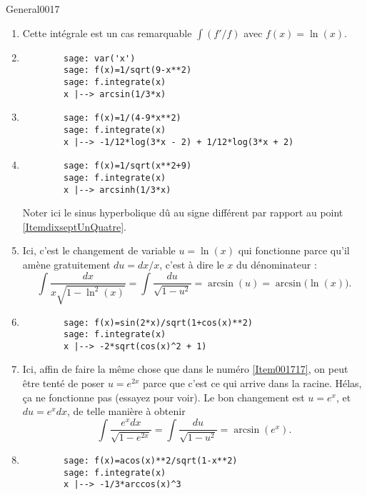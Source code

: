 \begin{corrige}{General0017}
\begin{enumerate}
\item
Cette intégrale est un cas remarquable $\int (f'/f)$ avec $f(x)=\ln(x)$.

\item\label{ItemdixseptUnQuatre}
	
	\begin{verbatim}
		sage: var('x')
		sage: f(x)=1/sqrt(9-x**2)
		sage: f.integrate(x)
		x |--> arcsin(1/3*x)
	\end{verbatim}


\item
	\begin{verbatim}
		sage: f(x)=1/(4-9*x**2)
		sage: f.integrate(x)   
		x |--> -1/12*log(3*x - 2) + 1/12*log(3*x + 2)
	\end{verbatim}
\item

	\begin{verbatim}
		sage: f(x)=1/sqrt(x**2+9)
		sage: f.integrate(x)     
		x |--> arcsinh(1/3*x)
	\end{verbatim}
	Noter ici le sinus hyperbolique dû au signe différent par rapport au point \ref{ItemdixseptUnQuatre}.
\item\label{Item001717}
Ici, c'est le changement de variable $u=\ln(x)$ qui fonctionne parce qu'il amène gratuitement $du=dx/x$, c'est à dire le $x$ du dénominateur :
\begin{equation}
	\int\frac{ dx }{ x\sqrt{1-\ln^2(x)} }=\int\frac{ du }{ \sqrt{1-u^2} }=\arcsin(u)=\arcsin\big( \ln(x) \big).
\end{equation}

\item

	\begin{verbatim}
		sage: f(x)=sin(2*x)/sqrt(1+cos(x)**2)
		sage: f.integrate(x)                 
		x |--> -2*sqrt(cos(x)^2 + 1)
	\end{verbatim}
	

\item
Ici, affin de faire la même chose que dans le numéro \ref{Item001717}, on peut être tenté de poser $u= e^{2x}$ parce que c'est ce qui arrive dans la racine. Hélas, ça ne fonctionne pas (essayez pour voir). Le bon changement est $u=e^x$, et $du= e^{x}dx$, de telle manière à obtenir
\begin{equation}
	\int\frac{  e^{x}dx }{ \sqrt{1- e^{2x}} }=\int\frac{ du }{ \sqrt{1-u^2} }=\arcsin(e^x).
\end{equation}

\item
	\begin{verbatim}
		sage: f(x)=acos(x)**2/sqrt(1-x**2)
		sage: f.integrate(x)              
		x |--> -1/3*arccos(x)^3
	\end{verbatim}


\end{enumerate}
\end{corrige}
